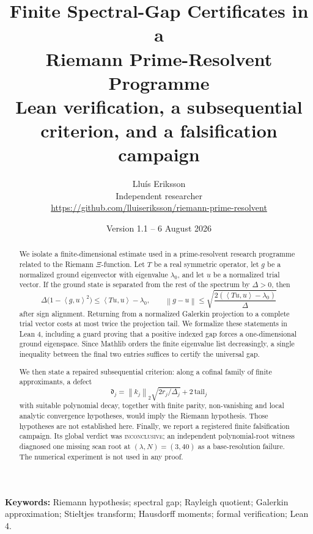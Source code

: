 \documentclass[11pt]{article}
\title{\textbf{Finite Spectral-Gap Certificates in a\\
Riemann Prime-Resolvent Programme}\\[4pt]
\large Lean verification, a subsequential criterion, and a falsification campaign}
\author{Llu\'is Eriksson\\
\small Independent researcher\\
\small \url{https://github.com/lluiseriksson/riemann-prime-resolvent}}
\date{Version 1.1 -- 6 August 2026}
\theoremstyle{definition}
\newcommand{\ip}[2]{\left\langle #1,#2\right\rangle}
\newcommand{\norm}[1]{\left\lVert #1\right\rVert}
\newcommand{\defect}{\mathfrak d}
\begin{document}
\maketitle
\thispagestyle{empty}

\begin{center}
\end{center}

\begin{abstract}
We isolate a finite-dimensional estimate used in a prime-resolvent research
programme related to the Riemann $\Xi$-function.  Let $T$ be a real symmetric
operator, let $g$ be a normalized ground eigenvector with eigenvalue $\lambda_0$,
and let $u$ be a normalized trial vector.  If the ground state is separated
from the rest of the spectrum by $\Delta>0$, then
\[
 \Delta\bigl(1-\ip{g}{u}^{2}\bigr)
 \leq \ip{Tu}{u}-\lambda_0,
 \qquad
 \norm{g-u}\leq
 \sqrt{\frac{2(\ip{Tu}{u}-\lambda_0)}{\Delta}}
\]
after sign alignment.  Returning from a normalized Galerkin projection to a
complete trial vector costs at most twice the projection tail.  We formalize
these statements in Lean 4, including a guard proving that a positive indexed
gap forces a one-dimensional ground eigenspace.  Since Mathlib orders the
finite eigenvalue list decreasingly, a single inequality between the final two
entries suffices to certify the universal gap.

We then state a repaired subsequential criterion: along a cofinal family of
finite approximants, a defect
\[
 \defect_j=\norm{k_j}_2\sqrt{2r_j/\Delta_j}+2\,\mathrm{tail}_j
\]
with suitable polynomial decay, together with finite parity, non-vanishing and
local analytic convergence hypotheses, would imply the Riemann hypothesis.
Those hypotheses are not established here.  Finally, we report a registered
finite falsification campaign.  Its global verdict was \textsc{inconclusive};
an independent polynomial-root witness diagnosed one missing scan root at
$(\lambda,N)=(3,40)$ as a base-resolution failure.  The numerical experiment
is not used in any proof.
\end{abstract}

\noindent\textbf{Keywords:} Riemann hypothesis; spectral gap; Rayleigh
quotient; Galerkin approximation; Stieltjes transform; Hausdorff moments;
formal verification; Lean 4.
\end{document}
